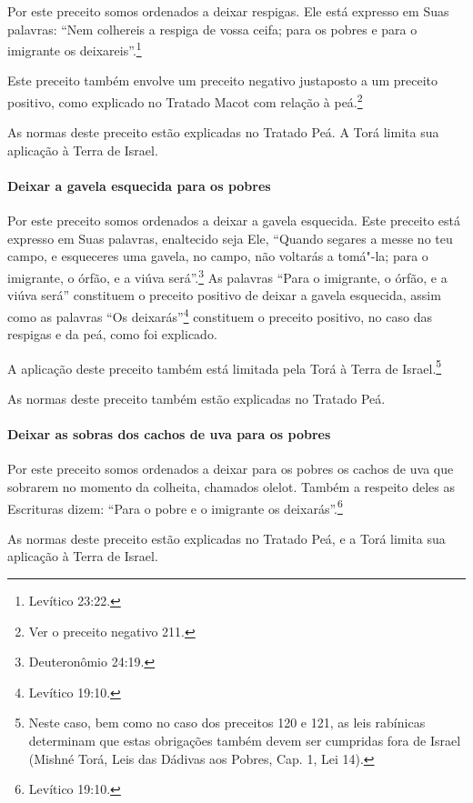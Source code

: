 \begin{multicols}{2}
Por este preceito somos ordenados a deixar respigas. Ele está expresso
em Suas palavras: ``Nem colhereis a respiga de vossa ceifa; para os
pobres e para o imigrante os deixareis''.\footnote{Levítico 23:22.}

Este preceito também envolve um preceito negativo justaposto a um
preceito positivo, como explicado no Tratado Macot\starr{} com relação à
peá\starr.\footnote{Ver o preceito negativo 211.}


As normas deste preceito estão explicadas no Tratado Peá\starr. A Torá\starr{} limita
sua aplicação à Terra de Israel.

\paragraph{Deixar a gavela esquecida para os pobres}

Por este preceito somos ordenados a deixar a gavela esquecida. Este
preceito está expresso em Suas palavras, enaltecido seja Ele, ``Quando
segares a messe no teu campo, e esqueceres uma gavela, no campo, não
voltarás a tomá"-la; para o imigrante, o órfão, e a viúva será''.\footnote{Deuteronômio 24:19.} As palavras ``Para o imigrante, o órfão, e a viúva
será'' constituem o preceito positivo de
deixar a gavela esquecida, assim como as palavras ``Os deixarás''\footnote{Levítico 19:10.} constituem o preceito positivo, no caso das respigas e da peá\starr, como
foi explicado.

A aplicação deste preceito também está limitada pela Torá\starr{} à Terra de Israel.\footnote{Neste caso, bem como no caso dos preceitos 120 e 121, as leis
  rabínicas determinam que estas obrigações também devem ser cumpridas
  fora de Israel (Mishné Torá\starr, Leis das Dádivas aos Pobres, Cap. 1,
  Lei 14).}

As normas deste preceito também estão explicadas no Tratado Peá\starr.

\paragraph{Deixar as sobras dos cachos de uva para os pobres}

Por este preceito somos ordenados a deixar para os pobres os cachos de
uva que sobrarem no momento da colheita, chamados olelot\starr. Também a
respeito deles as Escrituras dizem: ``Para o pobre e o imigrante os
deixarás''.\footnote{Levítico 19:10.}

As normas deste preceito estão explicadas no Tratado Peá\starr, e a Torá\starr{}
limita sua aplicação à Terra de Israel.


\end{multicols}
